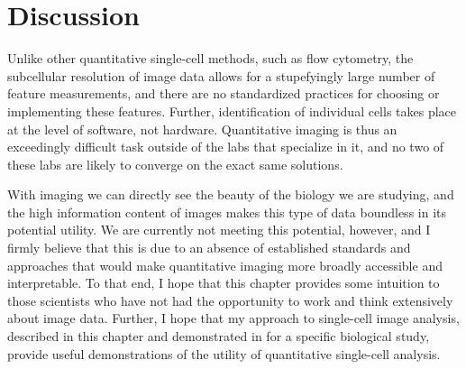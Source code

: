 \section{Discussion}
\label{imaging:discussion}

Unlike other quantitative single-cell
methods, such as flow cytometry, the subcellular resolution of
image data allows for a stupefyingly
large number of feature measurements, and there are no standardized
practices for choosing or implementing these
features. Further, identification of individual
cells takes place at the level of software, not
hardware. Quantitative imaging is thus an
exceedingly difficult task outside of the labs
that specialize in it, and no two of these labs
are likely to converge on the exact same solutions.


With imaging we can directly see the beauty of the
biology we are studying, and the high information
content of images makes this type of data boundless
in its potential utility. We are currently not
meeting this potential, however, and I firmly believe
that this is due to an absence of established standards
and approaches that would make quantitative imaging more broadly accessible
and interpretable. To that end, I hope that this chapter
provides some intuition to those scientists who have
not had the opportunity to work and think extensively
about image data. Further, I hope that my approach
to single-cell image analysis, described in this chapter
and demonstrated in  for
a specific biological study, provide useful demonstrations of the utility
of quantitative single-cell analysis.


